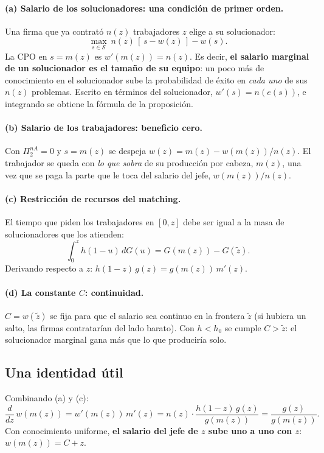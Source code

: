 \documentclass[11pt]{article}
\theoremstyle{definition}
\theoremstyle{remark}
\newcommand{\zt}{\tilde z}
\newcommand{\Sset}{\mathcal S}
\begin{document}
\paragraph{(a) Salario de los solucionadores: una condición de primer orden.}
Una firma que ya contrató $n(z)$ trabajadores $z$ elige a su solucionador:
\[
  \max_{s\in\Sset}\ n(z)\,[\,s-w(z)\,]-w(s).
\]
La CPO en $s=m(z)$ es $w'(m(z))=n(z)$. Es decir, \textbf{el salario marginal de un solucionador es el tamaño de su equipo}: un poco más de conocimiento en el solucionador sube la probabilidad de éxito en \emph{cada uno} de sus $n(z)$ problemas. Escrito en términos del solucionador, $w'(s)=n(e(s))$, e integrando se obtiene la fórmula de la proposición.

\paragraph{(b) Salario de los trabajadores: beneficio cero.}
Con $\Pi_2^{nA}=0$ y $s=m(z)$ se despeja $w(z)=m(z)-w(m(z))/n(z)$. El trabajador se queda con \emph{lo que sobra} de su producción por cabeza, $m(z)$, una vez que se paga la parte que le toca del salario del jefe, $w(m(z))/n(z)$.

\paragraph{(c) Restricción de recursos del matching.}
El tiempo que piden los trabajadores en $[0,z]$ debe ser igual a la masa de solucionadores que los atienden:
\begin{equation}\label{eq:resource}
  \int_0^{z} h(1-u)\,dG(u) = G(m(z))-G(\zt).
\end{equation}
Derivando respecto a $z$: $h(1-z)\,g(z)=g(m(z))\,m'(z)$.

\paragraph{(d) La constante $C$: continuidad.}
$C=w(\zt)$ se fija para que el salario sea continuo en la frontera $\zt$ (si hubiera un salto, las firmas contratarían del lado barato). Con $h<h_0$ se cumple $C>\zt$: el solucionador marginal gana más que lo que produciría solo.

\subsection{Una identidad útil}

Combinando (a) y (c):
\begin{equation}\label{eq:key}
  \frac{d}{dz}\,w(m(z)) = w'(m(z))\,m'(z)= n(z)\cdot\frac{h(1-z)\,g(z)}{g(m(z))}=\frac{g(z)}{g(m(z))}.
\end{equation}
Con conocimiento uniforme, \textbf{el salario del jefe de $z$ sube uno a uno con $z$}: $w(m(z))=C+z$.
\end{document}
